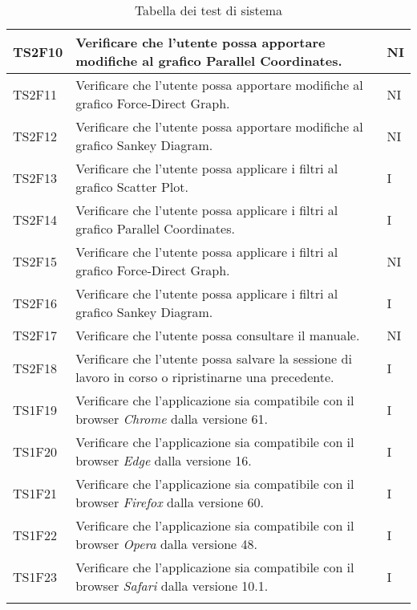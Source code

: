 \begin{center}
\begin{longtable}{|p{1.5cm}|p{11cm}|p{1cm}|}
            \rowcolor[HTML]{EFEFEF}
            TS2F10 & Verificare che l’utente possa apportare modifiche al grafico Parallel Coordinates. & NI\\ \hline
            \rowcolor[HTML]{C0C0C0}
            TS2F11 & Verificare che l’utente possa apportare modifiche al grafico Force-Direct Graph. & NI\\ \hline
            \rowcolor[HTML]{EFEFEF}
            TS2F12 & Verificare che l’utente possa apportare modifiche al grafico Sankey Diagram. & NI\\ \hline
            \rowcolor[HTML]{C0C0C0}
            TS2F13 & Verificare che l’utente possa applicare i filtri al grafico Scatter Plot. & I\\ \hline
            \rowcolor[HTML]{EFEFEF}
            TS2F14 & Verificare che l’utente possa applicare i filtri al grafico Parallel Coordinates. & I\\ \hline
            \rowcolor[HTML]{C0C0C0}
            TS2F15 & Verificare che l’utente possa applicare i filtri al grafico Force-Direct Graph. & NI\\ \hline
            \rowcolor[HTML]{EFEFEF}
            TS2F16 & Verificare che l’utente possa applicare i filtri al grafico Sankey Diagram. & I\\ \hline
            \rowcolor[HTML]{C0C0C0}
            TS2F17 & Verificare che l’utente possa consultare il manuale. & NI\\ \hline
            \rowcolor[HTML]{EFEFEF}
            TS2F18 & Verificare che l’utente possa salvare la sessione di lavoro in corso o ripristinarne una precedente. & I\\ \hline
            \rowcolor[HTML]{C0C0C0}
            TS1F19 & Verificare che l'applicazione sia compatibile con il browser \textit{Chrome} dalla versione 61. & I\\ \hline
            \rowcolor[HTML]{EFEFEF}
            TS1F20 & Verificare che l'applicazione sia compatibile con il browser \textit{Edge} dalla versione 16. & I\\ \hline
            \rowcolor[HTML]{C0C0C0}
            TS1F21 & Verificare che l'applicazione sia compatibile con il browser \textit{Firefox} dalla versione 60. & I\\ \hline
            \rowcolor[HTML]{EFEFEF}
            TS1F22 & Verificare che l'applicazione sia compatibile con il browser \textit{Opera} dalla versione 48. & I\\ \hline
            \rowcolor[HTML]{C0C0C0}
            TS1F23 & Verificare che l'applicazione sia compatibile con il browser \textit{Safari} dalla versione 10.1. & I\\ \hline
            \caption{Tabella dei test di sistema}
        \end{longtable}
    \end{center}

